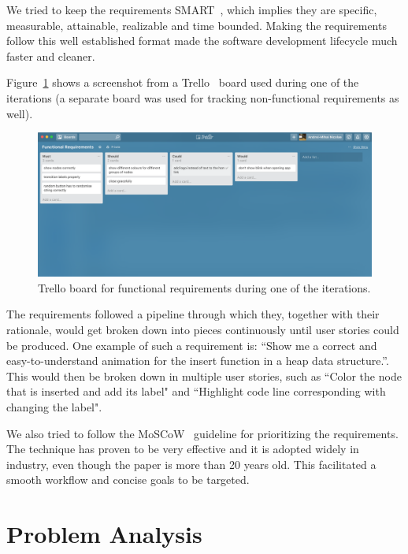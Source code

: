 \documentclass{l4proj}
\begin{document}
We tried to keep the requirements SMART~\cite{smart-requirements}, which implies they are specific, measurable,
attainable, realizable and time bounded. Making the requirements follow this well established format made the software development lifecycle much faster and cleaner.

Figure~\ref{fig:trello-functional-requirements} shows a screenshot from a Trello~\cite{trello} board used during one of the iterations (a separate board was used for tracking non-functional requirements as well).

\begin{figure}[!ht]
\centering
\includegraphics[scale=0.35]{trello-functional-requirements}
\caption{Trello board for functional requirements during one of the iterations.}
\label{fig:trello-functional-requirements}
\end{figure}

The requirements followed a pipeline through which they, together with their rationale, would get broken down
into pieces continuously until user stories could be produced. One example of such a requirement is: ``Show me a
correct and easy-to-understand animation for the insert function in a heap data structure.''. This would then be broken
down in multiple user stories, such as ``Color the node that is inserted and add its label" and ``Highlight code line corresponding with changing the label".

We also tried to follow the MoSCoW~\cite{moscow-requirements} guideline for prioritizing the requirements. The technique has proven to be very effective and it is adopted widely in industry, even though the paper is more than 20 years old. This facilitated a smooth workflow and concise goals to be targeted.

\section{Problem Analysis}
\end{document}
